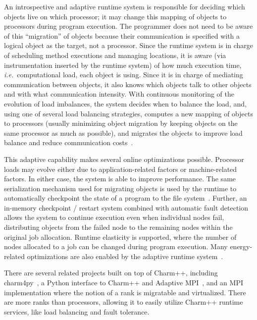 \documentclass[12pt,letterpaper]{article}
\begin{document}
An introspective and adaptive runtime system is responsible for deciding which objects live on which processor; it may change this mapping of objects to processors during program execution. The programmer does not need to be aware of this ``migration'' of objects because their communication is specified with a logical object as the target, not a processor. Since the runtime system is in charge of scheduling method executions and managing locations, it is aware (via instrumentation inserted by the runtime system) of how much execution time, \emph{i.e.}\ computational load, each object is using. Since it is in charge of mediating communication between objects, it also knows which objects talk to other objects and with what communication intensity. With continuous monitoring of the evolution of load imbalances, the system decides when to balance the load, and, using one of several load balancing strategies, computes a new mapping of objects to processors (usually minimizing object migration by keeping objects on the same processor as much as possible), and migrates the objects to improve load balance and reduce communication costs~\cite{appBalancer99}.

This adaptive capability makes several online optimizations possible. Processor loads may evolve either due to application-related factors or machine-related factors. In either case, the system is able to improve performance. The same serialization mechanism used for migrating objects is used by the runtime to automatically checkpoint the state of a program to the file system~\cite{ftCharm14}. Further, an in-memory checkpoint / restart system combined with automatic fault detection allows the system to continue execution even when individual nodes fail, distributing objects from the failed node to the remaining nodes within the original job allocation. Runtime elasticity is supported, where the number of nodes allocated to a job can be changed during program execution. Many energy-related optimizations are also enabled by the adaptive runtime system~\cite{acun2016power}. 

There are several related projects built on top of Charm++, including charm4py~\cite{galvez2018charmpy}, a Python interface to Charm++ and Adaptive MPI~\cite{CharmPDAABook09}, and an MPI implementation where the notion of a rank is migratable and virtualized. There are more ranks than processors, allowing it to easily utilize Charm++ runtime services, like load balancing and fault tolerance.

\end{document}
